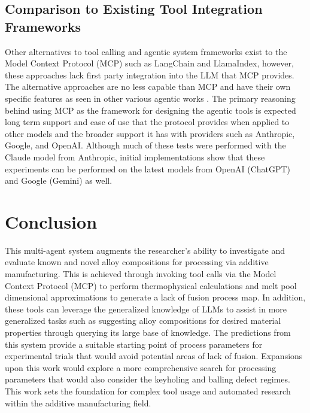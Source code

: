 \subsection{Comparison to Existing Tool Integration Frameworks}
Other alternatives to tool calling and agentic system frameworks exist to the
Model Context Protocol (MCP) such as LangChain and LlamaIndex, however, these
approaches lack first party integration into the LLM that MCP provides. The
alternative approaches are no less capable than MCP and have their own specific
features as seen in other various agentic works \cite{jadhav_llm-3d_2025,
chandrasekhar_amgpt_2024}. The primary reasoning behind using MCP as the
framework for designing the agentic tools is expected long term support and ease
of use that the protocol provides when applied to other models and the broader
support it has with providers such as Anthropic, Google, and OpenAI. Although
much of these tests were performed with the Claude model from Anthropic, initial
implementations show that these experiments can be performed on the latest
models from OpenAI (ChatGPT) and Google (Gemini) as well.

\section{Conclusion}

This multi-agent system augments the researcher's ability to investigate and
evaluate known and novel alloy compositions for processing via additive
manufacturing. This is achieved through invoking tool calls via the Model
Context Protocol (MCP) to perform thermophysical calculations and melt pool
dimensional approximations to generate a lack of fusion process map. In
addition, these tools can leverage the generalized knowledge of LLMs to assist
in more generalized tasks such as suggesting alloy compositions for desired
material properties through querying its large base of knowledge. The
predictions from this system provide a suitable starting point of process
parameters for experimental trials that would avoid potential areas of lack of
fusion. Expansions upon this work would explore a more comprehensive search for
processing parameters that would also consider the keyholing and balling defect
regimes. This work sets the foundation for complex tool usage and automated
research within the additive manufacturing field.

\clearpage


